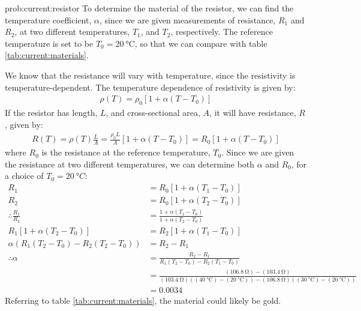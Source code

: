 \begin{solution}{prob:current:resistor}\label{soln:current:resistor}
To determine the material of the resistor, we can find the temperature coefficient, $\alpha$, since we are given measurements of resistance, $R_1$ and $R_2$, at two different temperatures, $T_1$, and $T_2$, respectively. The reference temperature is set to be $T_0=\SI{20}{\degreeCelsius}$, so that we can compare with table \ref{tab:current:materials}.

We know that the resistance will vary with temperature, since the resistivity is temperature-dependent. The temperature dependence of resistivity is given by:
\begin{align*}
\rho(T)=\rho_0[1+\alpha(T-T_0)]
\end{align*}
If the resistor has length, $L$, and cross-sectional area, $A$, it will have resistance, $R$, given by:
\begin{align*}
R(T)=\rho(T) \frac{L}{A}=\frac{\rho_0 L}{A}[1+\alpha(T-T_0)]=R_0[1+\alpha(T-T_0)]
\end{align*}
where $R_0$ is the resistance at the reference temperature, $T_0$. Since we are given the resistance at two different temperatures, we can determine both $\alpha$ and $R_0$, for a choice of $T_0=\SI{20}{\degree C}$:
\begin{align*}
R_1&=R_0[1+\alpha(T_1-T_0)]\\
R_2&=R_0[1+\alpha(T_2-T_0)]\\
\therefore\frac{R_1}{R_2}&=\frac{1+\alpha(T_1-T_0)}{1+\alpha(T_2-T_0)}\\
R_1 [1+\alpha(T_2-T_0)]&=R_2 [1+\alpha(T_1-T_0)]\\
\alpha \left( R_1(T_2-T_0) - R_2(T_2-T_0) \right)&=R_2-R_1\\
\therefore \alpha &= \frac{R_2-R_1}{R_1(T_2-T_0) - R_2(T_1-T_0) }\\
&=\frac{(\SI{106.8}{\ohm}) - (\SI{103.4}{\ohm})}{(\SI{103.4}{\ohm})((\SI{40}{\degreeCelsius})-(\SI{20}{\degreeCelsius})) - (\SI{106.8}{\ohm})((\SI{30}{\degreeCelsius})-(\SI{20}{\degreeCelsius})) }\\
&=0.0034
\end{align*}
Referring to table \ref{tab:current:materials}, the material could likely be gold.

\end{solution}


